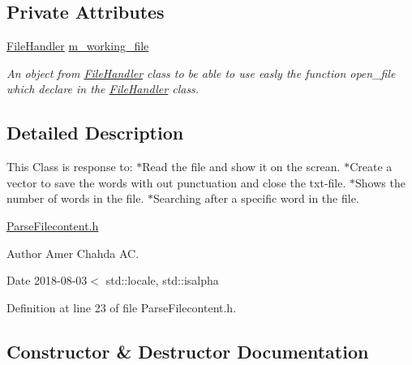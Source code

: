 \subsection*{Private Attributes}
\begin{DoxyCompactItemize}
\item 
\mbox{\hyperlink{class_file_handler}{File\+Handler}} \mbox{\hyperlink{class_parse___file__content_a9c8b30de899c7c814c22b444146c54d9}{m\+\_\+working\+\_\+file}}
\begin{DoxyCompactList}\small\item\em An object from \mbox{\hyperlink{class_file_handler}{File\+Handler}} class to be able to use easly the function open\+\_\+file which declare in the \mbox{\hyperlink{class_file_handler}{File\+Handler}} class. \end{DoxyCompactList}\end{DoxyCompactItemize}


\subsection{Detailed Description}
This Class is response to\+: $\ast$\+Read the file and show it on the screan. $\ast$\+Create a vector to save the words with out punctuation and close the txt-\/file. $\ast$\+Shows the number of words in the file. $\ast$\+Searching after a specific word in the file. 

\mbox{\hyperlink{_parse_filecontent_8h}{Parse\+Filecontent.\+h}} \begin{DoxyAuthor}{Author}
Amer Chahda AC. 
\end{DoxyAuthor}
\begin{DoxyDate}{Date}
2018-\/08-\/03$<$ std\+::locale, std\+::isalpha 
\end{DoxyDate}


Definition at line 23 of file Parse\+Filecontent.\+h.



\subsection{Constructor \& Destructor Documentation}
\mbox{\label{class_parse___file__content_a1f24218f4f9a445f020381139bb7dc9f}} 
